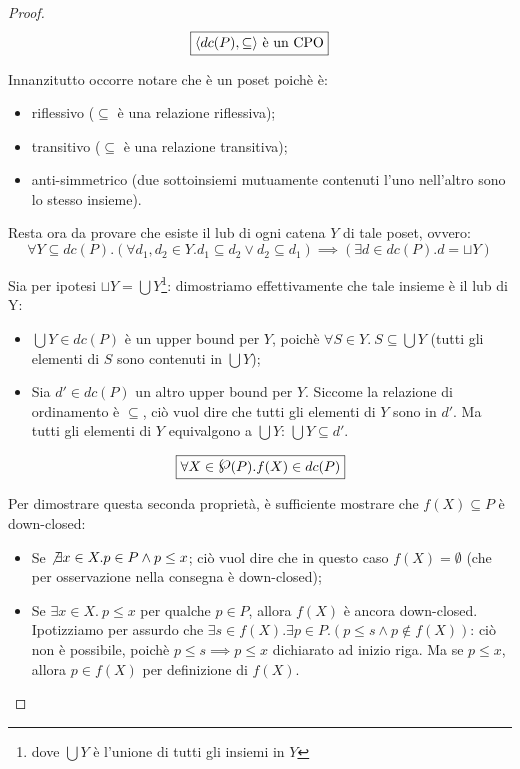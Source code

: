 \begin{proof}

$$
\boxed{\text{\ensuremath{\langle{}dc(P), \subseteq\rangle{}} è un CPO}}
$$

Innanzitutto occorre notare che  è un poset poichè è:

\begin{itemize}
  \item riflessivo ($\subseteq$ è una relazione riflessiva);
  \item transitivo ($\subseteq$ è una relazione transitiva);
  \item anti-simmetrico (due sottoinsiemi mutuamente contenuti l'uno nell'altro
    sono lo stesso insieme).
\end{itemize}

Resta ora da provare che esiste il lub di ogni catena $Y$ di tale poset, ovvero:
$$
\forall{Y}\subseteq dc(P).
          (\forall{d_1,d_2}\in Y.d_1 \subseteq d_2 \lor d_2 \subseteq d_1)
              \implies
          (\exists{d}\in dc(P). d = \sqcup Y)
$$

Sia per ipotesi $\sqcup Y = \bigcup Y$\footnote{dove $\bigcup Y$ è l'unione di
tutti gli insiemi in $Y$}: dimostriamo effettivamente che tale insieme è il lub
di Y:
\begin{itemize}
  \item $\bigcup Y \in dc(P)$ è un upper bound per $Y$, poichè
    $\forall{S}\in Y.\ S \subseteq \bigcup Y$ (tutti gli elementi di $S$ sono
    contenuti in $\bigcup Y$);
  \item Sia $d'\in dc(P)$ un altro upper bound per $Y$. Siccome la relazione di
    ordinamento è $\subseteq$, ciò vuol dire che tutti gli elementi di $Y$ sono
    in $d'$. Ma tutti gli elementi di $Y$ equivalgono a $\bigcup Y$:
    $\bigcup Y \subseteq d'$.
\end{itemize}

$$
\boxer{\forall{X} \in \powerset{P}. f(X) \in dc(P)}
$$

Per dimostrare questa seconda proprietà, è sufficiente mostrare che
$f(X) \subseteq P$ è down-closed:

\begin{itemize}
  \item Se $\not \exists{x}\in X. p\in P \land p \leq x$; ciò vuol dire che in
    questo caso $f(X) = \emptyset$ (che per osservazione nella consegna è
    down-closed);
  \item Se $\exists{x}\in X.\ p \leq x$ per qualche $p \in P$, allora $f(X)$ è
    ancora down-closed. Ipotizziamo per assurdo che
    $\exists{s\in f(X)}.\exists{p}\in P.(p \leq s \land p \not \in f(X))$: ciò
    non è possibile, poichè $p \leq s \implies p \leq x$ dichiarato ad inizio
    riga. Ma se $p \leq x$, allora $p \in f(X)$ per definizione di $f(X)$.
\end{itemize}


\end{proof}
